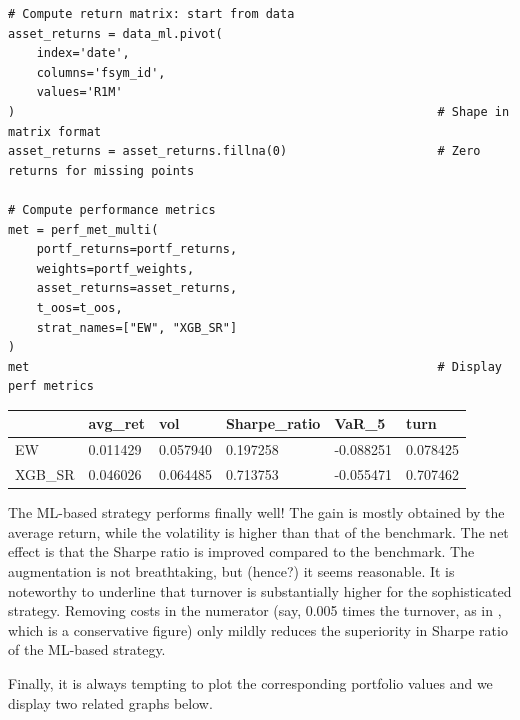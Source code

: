 \begin{verbatim}
# Compute return matrix: start from data
asset_returns = data_ml.pivot(
    index='date',
    columns='fsym_id',
    values='R1M'
)                                                           # Shape in matrix format
asset_returns = asset_returns.fillna(0)                     # Zero returns for missing points

# Compute performance metrics
met = perf_met_multi(
    portf_returns=portf_returns,
    weights=portf_weights,
    asset_returns=asset_returns,
    t_oos=t_oos,
    strat_names=["EW", "XGB_SR"]
)
met                                                         # Display perf metrics
\end{verbatim}

\bigskip\noindent
\begin{tabular}{p{}p{}p{}p{}p{}p{}}
\toprule
 & avg\_ret & vol & Sharpe\_ratio & VaR\_5 & turn \\
\hline
EW & 0.011429 & 0.057940 & 0.197258 & -0.088251 & 0.078425 \\
\hline
XGB\_SR & 0.046026 & 0.064485 & 0.713753 & -0.055471 & 0.707462 \\
\hline
\bottomrule
\end{tabular}

\bigskip

The ML-based strategy performs finally well! The gain is mostly obtained by the average return, while the volatility is higher than that of the benchmark. The net effect is that the Sharpe ratio is improved compared to the benchmark. The augmentation is not breathtaking, but (hence?) it seems reasonable. It is noteworthy to underline that turnover is substantially higher for the sophisticated strategy. Removing costs in the numerator (say, 0.005 times the turnover, as in \cite{goto2015improving}, which is a conservative figure) only mildly reduces the superiority in Sharpe ratio of the ML-based strategy.

Finally, it is always tempting to plot the corresponding portfolio values and we display two related graphs below.

